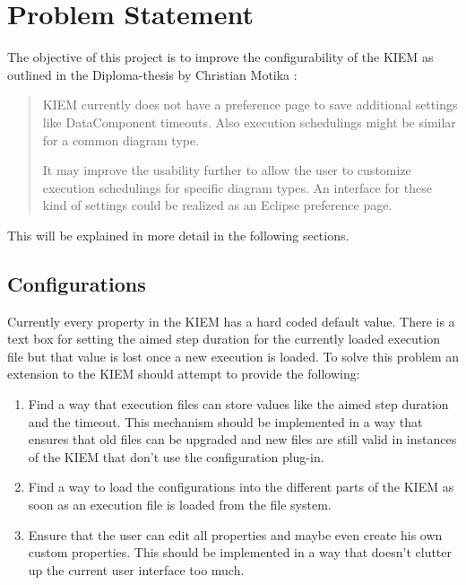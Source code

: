 \chapter{Problem Statement}
\label{chapter:ConfTask}
The objective of this project is to improve the configurability of the
\ac{KIEM} as outlined in the Diploma-thesis by Christian Motika \cite{cmot-dt}:
\begin{quote}
 \ac{KIEM} currently does not have a preference page to save
additional settings like DataComponent timeouts. Also execution schedulings
might be similar for a common diagram type.

It may improve the usability further to allow the user to customize execution
schedulings for specific diagram types. An interface for these kind of settings
could be realized as an Eclipse preference page.
\end{quote}
This will be explained in more detail in the following sections.
\section{Configurations}
Currently every property in the \ac{KIEM} has a hard coded default value. There is a text box
for setting the aimed step duration for the currently loaded execution file but that value
is lost once a new execution is loaded.
To solve this problem an extension to the \ac{KIEM} should attempt to provide the following:
\begin{enumerate}
 \item Find a way that execution files can store values like the aimed step duration and the timeout.
This mechanism should be implemented in a way that ensures that old files can be upgraded and new
files are still valid in instances of the \ac{KIEM} that don't use the configuration plug-in.
 \item Find a way to load the configurations into the different parts of the \ac{KIEM} as soon as an
execution file is loaded from the file system.
 \item Ensure that the user can edit all properties and maybe even create his own custom properties.
This should be implemented in a way that doesn't clutter up the current user interface too much.
\end{enumerate}


